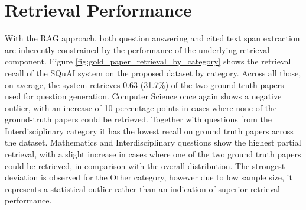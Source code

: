 

\section{Retrieval Performance}
With the RAG approach, both question answering and cited text span extraction are inherently constrained by the performance of the underlying retrieval component. Figure \ref{fig:gold_paper_retrieval_by_category} shows the retrieval recall of the SQuAI system on the proposed dataset by category. Across all those, on average, the system retrieves 0.63 (31.7\%) of the two ground-truth papers used for question generation. Computer Science once again shows a negative outlier, with an increase of 10 percentage points in cases where none of the ground-truth papers could be retrieved. Together with questions from the Interdisciplinary category it has the lowest recall on ground truth papers across the dataset. Mathematics and Interdisciplinary questions show the highest partial retrieval, with a slight increase in cases where one of the two ground truth papers could be retrieved, in comparison with the overall distribution.  
The strongest deviation is observed for the Other category, however due to low sample size, it represents a statistical outlier rather than an indication of superior retrieval performance. 



\pgfplotsset{compat=1.18}

